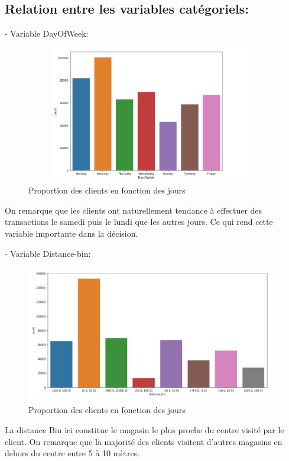 \subsection{Relation entre les variables catégoriels:}
- Variable DayOfWeek:\\
\begin{figure}[h]
\begin{center}
\includegraphics[width=15cm,height=6cm]{images/day_week.png}
\caption[Proportion des clients en fonction des jours]{Proportion des clients en fonction des jours}
\label{monlabel}
\end{center}
\end{figure}
On remarque que les clients ont naturellement tendance à effectuer des transactions le samedi puis le lundi que les autres jours. Ce qui rend cette variable importante dans la décision.

- Variable Distance-bin:\\
\begin{figure}[h]
\begin{center}
\includegraphics[width=15cm,height=6cm]{images/near_store.png}
\caption[Proportion des clients en fonction des jours]{Proportion des clients en fonction des jours}
\label{monlabel}
\end{center}
\end{figure}
La distance Bin ici constitue le magasin le plus proche du centre visité par le client. On remarque que la majorité des clients visitent d’autres magasins en dehors du centre entre 5 à 10 mètres.
\newpage

